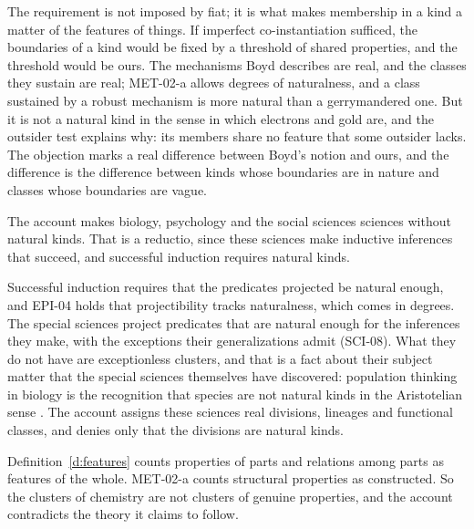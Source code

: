 \documentclass{situationist-preprint}
\begin{document}
\begin{reply}
The requirement is not imposed by fiat; it is what makes membership in a kind a matter of the features of things. If imperfect co-instantiation sufficed, the boundaries of a kind would be fixed by a threshold of shared properties, and the threshold would be ours. The mechanisms Boyd describes are real, and the classes they sustain are real; MET-02-a allows degrees of naturalness, and a class sustained by a robust mechanism is more natural than a gerrymandered one. But it is not a natural kind in the sense in which electrons and gold are, and the outsider test explains why: its members share no feature that some outsider lacks. The objection marks a real difference between Boyd's notion and ours, and the difference is the difference between kinds whose boundaries are in nature and classes whose boundaries are vague.
\end{reply}

\begin{objection}[Scientism]\label{o:scient}
The account makes biology, psychology and the social sciences sciences without natural kinds. That is a reductio, since these sciences make inductive inferences that succeed, and successful induction requires natural kinds.
\end{objection}

\begin{reply}
Successful induction requires that the predicates projected be natural enough, and EPI-04 holds that projectibility tracks naturalness, which comes in degrees. The special sciences project predicates that are natural enough for the inferences they make, with the exceptions their generalizations admit (SCI-08). What they do not have are exceptionless clusters, and that is a fact about their subject matter that the special sciences themselves have discovered: population thinking in biology is the recognition that species are not natural kinds in the Aristotelian sense \citep{Sober1980}. The account assigns these sciences real divisions, lineages and functional classes, and denies only that the divisions are natural kinds.
\end{reply}

\begin{objection}\label{o:features}
Definition~\ref{d:features} counts properties of parts and relations among parts as features of the whole. MET-02-a counts structural properties as constructed. So the clusters of chemistry are not clusters of genuine properties, and the account contradicts the theory it claims to follow.
\end{objection}
\end{document}
